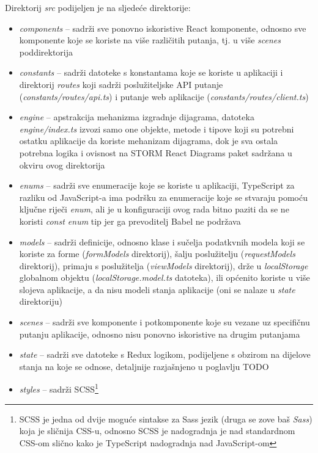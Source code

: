 \documentclass[times, utf8, diplomski, numeric]{fer}
\newcommand{\razmakp}{\vspace{18pt}}
\begin{document}
\razmakp

\noindent Direktorij \emph{src} podijeljen je na sljedeće direktorije:

\begin{itemize}
    \item \emph{components} -- sadrži sve ponovno iskoristive React komponente, odnosno sve komponente koje se koriste na više različitih putanja, tj. u više \emph{scenes} poddirektorija
    \item \emph{constants} -- sadrži datoteke s konstantama koje se koriste u aplikaciji i direktorij \emph{routes} koji sadrži poslužiteljske API putanje (\emph{constants/routes/api.ts}) i putanje web aplikacije (\emph{constants/routes/client.ts})
    \item \emph{engine} -- apstrakcija mehanizma izgradnje dijagrama, datoteka \emph{engine/index.ts} izvozi samo one objekte, metode i tipove koji su potrebni ostatku aplikacije da koriste mehanizam dijagrama, dok je sva ostala potrebna logika i ovisnost na STORM React Diagrams paket sadržana u okviru ovog direktorija
    \item \emph{enums} -- sadrži sve enumeracije koje se koriste u aplikaciji, TypeScript za razliku od JavaScript-a ima podršku za enumeracije koje se stvaraju pomoću ključne riječi \emph{enum}, ali je u konfiguraciji ovog rada bitno paziti da se ne koristi \emph{const enum} tip jer ga prevoditelj Babel ne podržava
    \item \emph{models} -- sadrži definicije, odnosno klase i sučelja podatkvnih modela koji se koriste za forme (\emph{formModels} direktorij), šalju poslužitelju (\emph{requestModels} direktorij), primaju s poslužitelja (\emph{viewModels} direktorij), drže u \emph{localStorage} globalnom objektu (\emph{localStorage.model.ts} datoteka), ili općenito koriste u više slojeva aplikacije, a da nisu modeli stanja aplikacije (oni se nalaze u \emph{state} direktoriju)
    \item \emph{scenes} -- sadrži sve komponente i potkomponente koje su vezane uz specifičnu putanju aplikacije, odnosno nisu ponovno iskoristive na drugim putanjama
    \item \emph{state} -- sadrži sve datoteke s Redux logikom, podijeljene s obzirom na dijelove stanja na koje se odnose, detaljnije razjašnjeno u poglavlju TODO
    \item \emph{styles} -- sadrži SCSS\footnote{
        SCSS je jedna od dvije moguće sintakse za Sass jezik (druga se zove baš \emph{Sass}) koja je sličnija CSS-u, odnosno SCSS je nadogradnja  je nad standardnom CSS-om slično kako je TypeScript nadogradnja nad JavaScript-om
}
\end{itemize}
\end{document}
